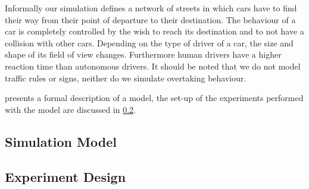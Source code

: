Informally our simulation defines a network of streets in which cars have to find their way from their point of departure to their destination. The behaviour of a car is completely controlled by the wish to reach its destination and to not have a collision with other cars. Depending on the type of driver of a car, the size and shape of its field of view changes. 
Furthermore human drivers have a higher reaction time than autonomous drivers. It should be noted that we do not model traffic rules or signs, neither do we simulate overtaking behaviour. 

 presents a formal description of a model, the set-up of the experiments performed with the model are discussed in \cref{sub:method:design}.

\subsection{Simulation Model}
\label{sub:method:model}



\subsection{Experiment Design}
\label{sub:method:design}
